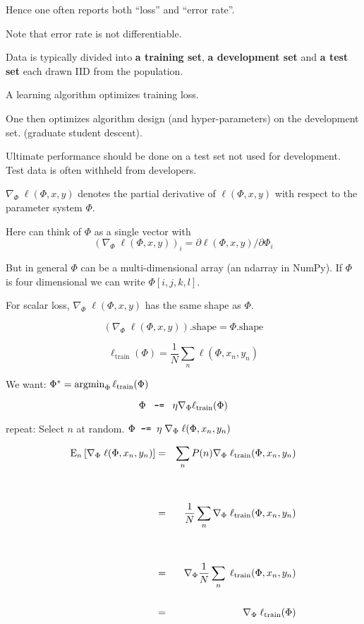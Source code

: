 {\vfill
Hence one often reports both ``loss'' and ``error rate''.

\vfill
Note that error rate is not differentiable.


Data is typically divided into {\bf a training set}, {\bf a development set} and {\bf a test set} each drawn IID from the population.

\vfill
A learning algorithm optimizes training loss.

\vfill
One then optimizes algorithm design (and hyper-parameters) on the development set. (graduate student descent).

\vfill
Ultimate performance should be done on a test set not used for development.  Test data is often withheld from developers.


$\nabla_\Phi\;\ell(\Phi,x,y)$ denotes the partial derivative of $\ell(\Phi,x,y)$ with respect to the parameter system $\Phi$.

\vfill
Here can think of $\Phi$ as a single vector with
$$(\nabla_\Phi \;\ell(\Phi,x,y))_i = \partial \ell(\Phi,x,y) /\partial \Phi_i$$

\vfill
But in general $\Phi$ can be a multi-dimensional array (an ndarray in NumPy). If $\Phi$ is four dimensional we can write $\Phi[i,j,k,l]$.

\vfill
For scalar loss, $\nabla_\Phi \;\ell(\Phi,x,y)$ has the same shape as $\Phi$.

\vfill
$$\left(\nabla_\Phi \;\ell(\Phi,x,y)\right).\mathrm{shape} = \Phi.\mathrm{shape}$$


$$\ell_{\mathrm{train}}(\Phi) = \frac{1}{N}\sum_n \ell(\Phi,x_n,y_n)$$

\vfill
\centerline{We want: \hspace{3ex} $\Phi^*  =  \operatorname*{argmin}_\Phi \ell_{\mathrm{train}}(\Phi)$}

\vfill
$$\Phi \;\;\;\mbox{\tt -=}\;\;\; \eta \nabla_\Phi \ell_\mathrm{train}(\Phi)$$


\vfill
\vfill
repeat:  Select $n$ at random. $\Phi \;\;\mbox{\tt -=}\;\; \eta \;\nabla_\Phi \; \ell(\Phi,x_n,y_n)$

\begin{eqnarray*}
  \mathrm{E}_{n}\left[\nabla_\Phi \; \ell(\Phi,x_n,y_n)\right] & = & \sum_n P(n) \nabla_\Phi\;\ell_{\mathrm{train}}(\Phi,x_n,y_n) \\
  \\
  \\ & = & \frac{1}{N} \sum_n \nabla_\Phi\;\ell_{\mathrm{train}}(\Phi,x_n,y_n) \\
  \\
    \\ & = & \nabla_\Phi \frac{1}{N} \sum_n \;\ell_{\mathrm{train}}(\Phi,x_n,y_n) \\
  \\
  &  = & \nabla_\Phi\;\ell_{\mathrm{train}}(\Phi)
\end{eqnarray*}



}
